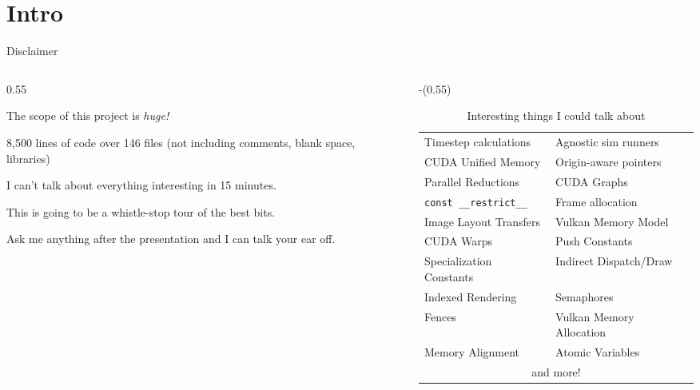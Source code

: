 \newcommand{\mytwocolumn}[3]{
    \begin{columns}[t,onlytextwidth]
        \begin{column}{#1\textwidth}
            #2
        \end{column}
        \begin{column}{\dimexpr\textwidth-(#1\textwidth)}
            #3
        \end{column}
    \end{columns}
}

\section{Intro}

\begin{frame}{Disclaimer}
    \mytwocolumn{0.55}{
        \begin{wideitemize}
            \item The scope of this project is \emph{\Large huge!}
            \item 8,500 lines of code over 146 files (not including comments, blank space, libraries)
            \item I can't talk about everything interesting in 15 minutes.
            \item This is going to be a whistle-stop tour of the best bits.
            \item Ask me anything after the presentation and I can talk your ear off.
        \end{wideitemize}
    }{
    \vspace{-1.3em}
    \bgroup\begin{table}[t]
        \centering
        {\scriptsize
        \def\arraystretch{2}%
        \begin{tabularx}{\textwidth}{|CC|}
            \hline
            Timestep calculations & Agnostic sim runners\\
            CUDA Unified Memory & Origin-aware pointers \\
            Parallel Reductions & CUDA Graphs \\
            \texttt{const \_\_restrict\_\_} & Frame allocation \\
            Image Layout Transfers & Vulkan Memory Model \\
            CUDA Warps & Push Constants \\
            Specialization Constants & Indirect Dispatch/Draw \\
            Indexed Rendering & Semaphores \\
            Fences & Vulkan Memory Allocation \\
            Memory Alignment & Atomic Variables \\
            \multicolumn{2}{|c|}{and more!} \\
            \hline
        \end{tabularx}
        }
        \caption{Interesting things I could talk about}
    \end{table}\egroup
    }
\end{frame}

